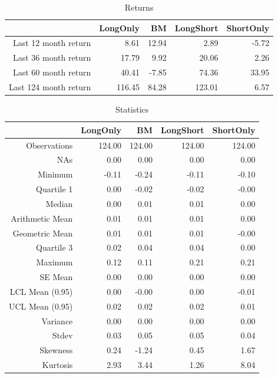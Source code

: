 \documentclass{article}
\begin{document}
\begin{table}[ht]
\centering
\caption{Returns} 
\begin{tabular}{rrrrr}
  \hline
 & LongOnly & BM & LongShort & ShortOnly \\ 
  \hline
Last 12 month return & 8.61 & 12.94 & 2.89 & -5.72 \\ 
  Last 36 month return & 17.79 & 9.92 & 20.06 & 2.26 \\ 
  Last 60 month return & 40.41 & -7.85 & 74.36 & 33.95 \\ 
  Last 124 month return & 116.45 & 84.28 & 123.01 & 6.57 \\ 
   \hline
\end{tabular}
\end{table}%
\begin{table}[ht]
\centering
\caption{Statistics} 
\begin{tabular}{rrrrr}
  \hline
 & LongOnly & BM & LongShort & ShortOnly \\ 
  \hline
Observations & 124.00 & 124.00 & 124.00 & 124.00 \\ 
  NAs & 0.00 & 0.00 & 0.00 & 0.00 \\ 
  Minimum & -0.11 & -0.24 & -0.11 & -0.10 \\ 
  Quartile 1 & 0.00 & -0.02 & -0.02 & -0.00 \\ 
  Median & 0.00 & 0.01 & 0.01 & 0.00 \\ 
  Arithmetic Mean & 0.01 & 0.01 & 0.01 & 0.00 \\ 
  Geometric Mean & 0.01 & 0.01 & 0.01 & -0.00 \\ 
  Quartile 3 & 0.02 & 0.04 & 0.04 & 0.00 \\ 
  Maximum & 0.12 & 0.11 & 0.21 & 0.21 \\ 
  SE Mean & 0.00 & 0.00 & 0.00 & 0.00 \\ 
  LCL Mean (0.95) & 0.00 & -0.00 & 0.00 & -0.01 \\ 
  UCL Mean (0.95) & 0.02 & 0.02 & 0.02 & 0.01 \\ 
  Variance & 0.00 & 0.00 & 0.00 & 0.00 \\ 
  Stdev & 0.03 & 0.05 & 0.05 & 0.04 \\ 
  Skewness & 0.24 & -1.24 & 0.45 & 1.67 \\ 
  Kurtosis & 2.93 & 3.44 & 1.26 & 8.04 \\ 
   \hline
\end{tabular}
\end{table}
\end{document}
